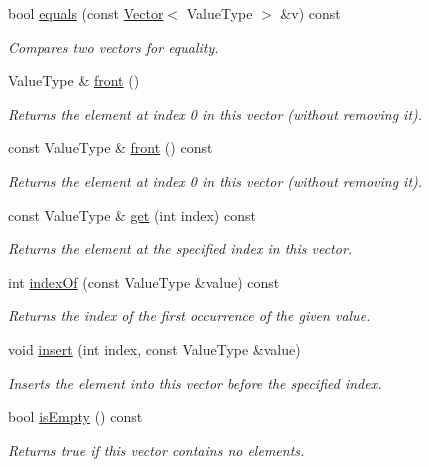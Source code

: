 \begin{DoxyCompactItemize}
bool \mbox{\hyperlink{classVector_ad25fe1a007a2f00611d831198a1a86ea}{equals}} (const \mbox{\hyperlink{classVector}{Vector}}$<$ Value\+Type $>$ \&v) const
\begin{DoxyCompactList}\small\item\em Compares two vectors for equality. \end{DoxyCompactList}\item 
Value\+Type \& \mbox{\hyperlink{classVector_a736a6bda35a26620407e175bee46ae4a}{front}} ()
\begin{DoxyCompactList}\small\item\em Returns the element at index 0 in this vector (without removing it). \end{DoxyCompactList}\item 
const Value\+Type \& \mbox{\hyperlink{classVector_a02aaa52ad7a120201f6dd3e90eff737f}{front}} () const
\begin{DoxyCompactList}\small\item\em Returns the element at index 0 in this vector (without removing it). \end{DoxyCompactList}\item 
const Value\+Type \& \mbox{\hyperlink{classVector_adcb38df411d14f0bd9c14e23947d2e1c}{get}} (int index) const
\begin{DoxyCompactList}\small\item\em Returns the element at the specified index in this vector. \end{DoxyCompactList}\item 
int \mbox{\hyperlink{classVector_a619aacfb96804495d3182a7131cf3539}{index\+Of}} (const Value\+Type \&value) const
\begin{DoxyCompactList}\small\item\em Returns the index of the first occurrence of the given value. \end{DoxyCompactList}\item 
void \mbox{\hyperlink{classVector_a0b5f5f8e87079d043caa9e5ed00d2941}{insert}} (int index, const Value\+Type \&value)
\begin{DoxyCompactList}\small\item\em Inserts the element into this vector before the specified index. \end{DoxyCompactList}\item 
bool \mbox{\hyperlink{classVector_acf82f9b2937375c7b1cf3dccb3df3312}{is\+Empty}} () const
\begin{DoxyCompactList}\small\item\em Returns {\ttfamily true} if this vector contains no elements. \end{DoxyCompactList}\item 

\end{DoxyCompactItemize}
